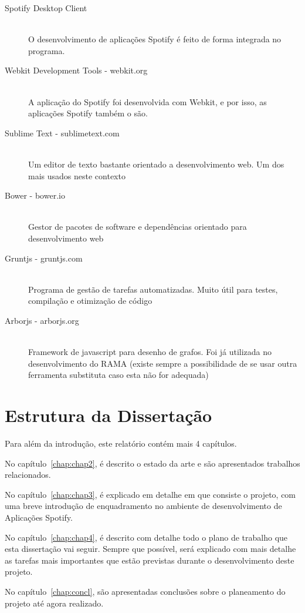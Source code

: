 \begin{description}
  \item[Spotify Desktop Client] \hfill \\
    O desenvolvimento de aplicações Spotify é feito de forma integrada no programa.
  \item[Webkit Development Tools - webkit.org] \hfill \\
    A aplicação do Spotify foi desenvolvida com Webkit, e por isso, as aplicações Spotify também o são.
  \item[Sublime Text - sublimetext.com] \hfill \\
    Um editor de texto bastante orientado a desenvolvimento web. Um dos mais usados neste contexto
  \item[Bower - bower.io] \hfill \\
    Gestor de pacotes de software e dependências orientado para desenvolvimento web
  \item[Gruntjs - gruntjs.com] \hfill \\
    Programa de gestão de tarefas automatizadas. Muito útil para testes, compilação e otimização de código
  \item[Arborjs - arborjs.org] \hfill \\
    Framework de javascript para desenho de grafos. Foi já utilizada no desenvolvimento do RAMA (existe sempre a possibilidade de se usar outra ferramenta substituta caso esta não for adequada)
\end{description}



\section{Estrutura da Dissertação} \label{sec:struct}

Para além da introdução, este relatório contém mais 4 capítulos.

No capítulo~\ref{chap:chap2}, é descrito o estado da arte e são
apresentados trabalhos relacionados.

No capítulo~\ref{chap:chap3}, é explicado em detalhe em que consiste o projeto, com uma breve introdução de enquadramento no ambiente de desenvolvimento de Aplicações Spotify.

No capítulo~\ref{chap:chap4}, é descrito com detalhe todo o plano de trabalho que esta dissertação vai seguir. 
Sempre que possível, será explicado com mais detalhe as tarefas mais importantes que estão previstas durante o desenvolvimento deste projeto.

No capítulo~\ref{chap:concl}, são apresentadas conclusões sobre o planeamento do projeto até agora realizado.
